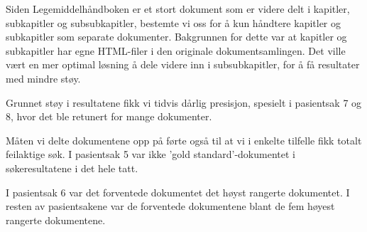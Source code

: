 Siden Legemiddelhåndboken er et stort dokument som er videre delt i kapitler, subkapitler og subsubkapitler, bestemte vi oss for å kun håndtere kapitler og subkapitler som separate dokumenter. Bakgrunnen for dette var at kapitler og subkapitler har egne HTML-filer i den originale dokumentsamlingen. Det ville vært en mer optimal løsning å dele videre inn i subsubkapitler, for å få resultater med mindre støy. 

Grunnet støy i resultatene fikk vi tidvis dårlig presisjon, spesielt i pasientsak 7 og 8, hvor det ble retunert for mange dokumenter. 

Måten vi delte dokumentene opp på førte også til at vi i enkelte tilfelle fikk totalt feilaktige søk. I pasientsak 5 var ikke 'gold standard'-dokumentet i søkeresultatene i det hele tatt. 

I pasientsak 6 var det forventede dokumentet det høyst rangerte dokumentet. 
I resten av pasientsakene var de forventede dokumentene blant de fem høyest rangerte dokumentene. 




